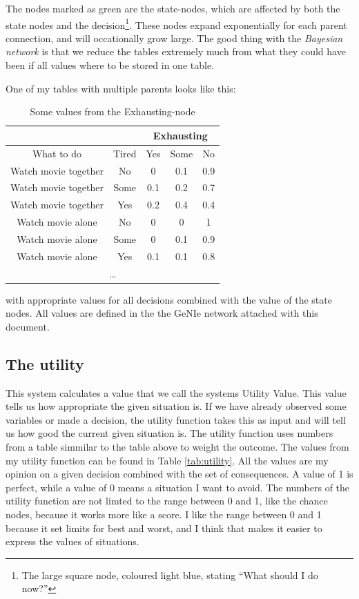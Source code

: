 The nodes marked as green are the state-nodes, which are affected by both
the state nodes and the decision\footnote{The large square node, coloured
light blue, stating ``What should I do now?''}. These nodes expand exponentially for
each parent connection, and will occationally grow large. The good thing with
the \emph{Bayesian network} is that we reduce the tables extremely much from
what they could have been if all values where to be stored in one table.

One of my tables with multiple parents looks like this:
\begin{table}[h!!!!!!!!!!!!!!!!!!]
\begin{tabular}{|c|c||c|c|c|}
\hline
\multicolumn{2}{|c|}{} & \multicolumn{3}{|c|}{Exhausting}\\
\hline
What to do & Tired & Yes & Some & No \\
\hline
\hline
Watch movie together & No & 0 & 0.1 & 0.9\\
Watch movie together & Some & 0.1 & 0.2 & 0.7\\
Watch movie together & Yes & 0.2 & 0.4 & 0.4\\
\hline
Watch movie alone & No & 0 & 0 & 1\\
Watch movie alone & Some & 0 & 0.1 & 0.9\\
Watch movie alone & Yes & 0.1 & 0.1 & 0.8\\
\hline
\multicolumn{5}{c}{\ldots}\\
\end{tabular}
\label{tab:exhaust}
\caption{Some values from the Exhausting-node}
\end{table}

with appropriate values for all decisions combined with the value of the state
nodes. All values are defined in the the GeNIe network attached with this
document.

\subsection{The utility}
This system calculates a value that we call the systems Utility Value. This
value tells us how appropriate the given situation is. If we have already
observed some variables or made a decision, the utility function takes this as
input and will tell us how good the current given situation is. The utility
function uses numbers from a table simmilar to the table above to weight the
outcome. The values from my utility function can be found in Table
\ref{tab:utility}. All the values are my opinion on a given decision combined
with the set of consequences. A value of 1 is perfect, while a value of 0 means
a situation I want to avoid. The numbers of the utility function are not limted
to the range between 0 and 1, like the chance nodes, because it works more like
a score. I like the range between 0 and 1 because it set limits for best and
worst, and I think that makes it easier to express the values of situations.

